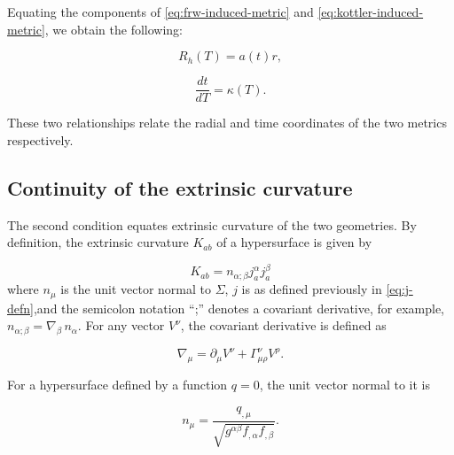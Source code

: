 Equating the components of \autoref{eq:frw-induced-metric} and \autoref{eq:kottler-induced-metric}, we obtain the following:

\begin{equation}
  R_h(T) = a(t)r
  \label{eq:r-to-ar},
\end{equation}

\begin{equation}
  \frac{dt}{dT} = \kappa(T).
  \label{eq:dt-dT}
\end{equation}


These two relationships relate the radial and time coordinates of the two metrics respectively. 

\subsection{Continuity of the extrinsic curvature}

The second condition equates extrinsic curvature of the two geometries. By definition, the extrinsic curvature $K_{ab}$ of a hypersurface is given by

\begin{equation}
  K_{ab} = n_{\alpha;\beta} j^{\alpha}_{a} j^{\beta}_{a}
  \label{eq:extrinsic-curvature-defn}
\end{equation}
where $n_{\mu}$ is the unit vector normal to $\Sigma$, $j$ is as defined previously in \autoref{eq:j-defn},and the semicolon notation ``;'' denotes a covariant derivative, for example, $n_{\alpha;\beta} = \nabla_{\beta}\, n_{\alpha}$. For any vector $V^{\nu}$, the covariant derivative is defined as

\begin{equation}
  \nabla_{\mu} = \partial_{\mu}V^{\nu} + \Gamma^{\nu}_{\mu \rho} V^{\rho}.
  \label{eq:covariant-derivative-defn}
\end{equation}

For a hypersurface defined by a function $q = 0$, the unit vector normal to it is

\begin{equation}
  n_{\mu} = \frac{q_{,\mu}}{\sqrt{g^{\alpha \beta} f_{,\alpha} f_{,\beta}}}.
  \label{eq:unit-normal-vector}
\end{equation}

